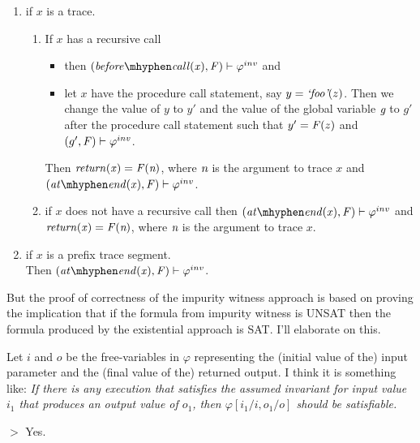 \begin{enumerate}
\begin{enumerate}
\begin{definition}
  \begin{enumerate}
  \item if $x$ is a trace.
    \begin{enumerate}
    \item If $x$ has a recursive call
      \begin{itemize}
      \item then $(\beforeCall{x}, \F) \satisfies \inv$ and
      \item let $x$ have the procedure call statement, say $y =
        \textit{`foo'}(z)$. Then we change the value of $y$ to $y'$ and the
        value of the global variable $\textit{g}$ to $g'$ after the procedure
        call statement such that $y' = \mathit{F}(z)$ and $(g', \mathit{F})
        \vdash \varphi^{inv}$.
      \end{itemize}
      Then $\mathit{return(x)} = \mathit{F}(\textit{n})$, where $\textit{n}$ is the argument to
      trace $x$ and $(\atEnd{x}, \F) \satisfies \inv$.
    \item if $x$ does not have a recursive call
      then $(\atEnd{x}, \F) \satisfies \inv$ and $\mathit{return(x)} =
      \mathit{F}(\textit{n})$, where $\textit{n}$ is the argument to trace $x$.
    \end{enumerate}
  \item if $x$ is a prefix trace segment.\\
    Then $(\atEnd{x}, \F) \satisfies \inv$.
  \end{enumerate}
\end{definition}


But the proof of correctness of the impurity witness approach is based
on proving the implication that if the formula from impurity witness
is UNSAT then the formula produced by the existential approach is
SAT. I'll elaborate on this.

Let $i$ and $o$ be the free-variables in $\varphi$
representing the (initial value of the) input parameter and the
(final value of the) returned output. I think it is something like:
\emph{
If there is any execution that
satisfies the assumed invariant for input value $i_1$ that produces
an output value of $o_1$, then $\varphi[i_1/i,o_1/o]$ should be
satisfiable.
}

$>$ Yes.


\end{enumerate}

\end{enumerate}
